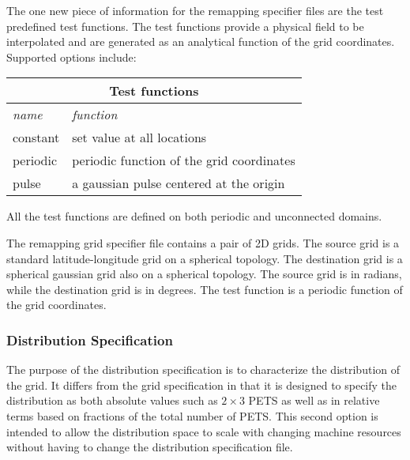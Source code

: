 The one new piece of information for the remapping specifier files are the test predefined test functions. The test functions provide a physical field to be interpolated and are generated as an analytical function of the grid coordinates. Supported options include:
\begin{center}
\begin{tabular}{| l | l |} 
\multicolumn{2}{c}{ Test functions }  \\
\hline 
{\em name } & {\em function} \\
\hline \hline
constant & set value at all locations \\
periodic & periodic function of the grid coordinates \\
pulse &  a gaussian pulse centered at the origin \\
\hline 
\end{tabular}
\end{center}
All the test functions are defined on both periodic and unconnected domains. 

The remapping grid specifier file contains a pair of 2D grids. The source grid is a standard latitude-longitude grid on a spherical topology. The destination grid is a spherical gaussian grid also on a spherical topology. The source grid is in radians, while the destination grid is in degrees. The test function is a periodic function of the grid coordinates. 

\subsubsection{Distribution Specification}
\label{sec:harness_distributionsspecifier}
The purpose of the distribution specification is to characterize the distribution of the grid. It differs from the grid specification in that it is designed to specify the distribution as both absolute values such as $2 \times 3$ PETS as well as in relative terms based on fractions of the total number of PETS. This second option is intended to allow the distribution space to scale with changing machine resources without having to change the distribution specification file. 

